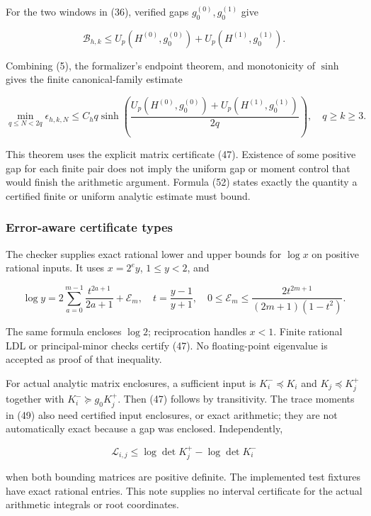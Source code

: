 For the two windows in (36), verified gaps \(g_0^{(0)},g_0^{(1)}\) give

\[
 \boxed{\mathcal B_{h,k}\le
 U_p(H^{(0)},g_0^{(0)})+U_p(H^{(1)},g_0^{(1)}).}                   \tag{51}
\]

Combining (5), the formalizer's endpoint theorem, and monotonicity of \(\sinh\) gives the finite canonical-family estimate

\[
 \boxed{
 \min_{q\le N<2q}\epsilon_{h,k,N}
 \le C_hq\sinh\!\left(
 \frac{U_p(H^{(0)},g_0^{(0)})+U_p(H^{(1)},g_0^{(1)})}{2q}
 \right),\quad q\ge k\ge3.}                                     \tag{52}
\]

This theorem uses the explicit matrix certificate (47). Existence of some positive gap for each finite pair does not imply the uniform gap or moment control that would finish the arithmetic argument. Formula (52) states exactly the quantity a certified finite or uniform analytic estimate must bound.

\subsubsection{Error-aware certificate types}\label{endpoint-restriction_original--error-aware-certificate-types}

The checker supplies exact rational lower and upper bounds for \(\log x\) on positive rational inputs. It uses \(x=2^e y\), \(1\le y<2\), and

\[
 \log y=2\sum_{a=0}^{m-1}\frac{t^{2a+1}}{2a+1}+\mathcal E_m,
 \quad t=\frac{y-1}{y+1},\quad
 0\le\mathcal E_m\le
 \frac{2t^{2m+1}}{(2m+1)(1-t^2)}.                                 \tag{53}
\]

The same formula encloses \(\log2\); reciprocation handles \(x<1\). Finite rational LDL or principal-minor checks certify (47). No floating-point eigenvalue is accepted as proof of that inequality.

For actual analytic matrix enclosures, a sufficient input is \(K_i^-\preceq K_i\) and \(K_j\preceq K_j^+\) together with \(K_i^-\succeq g_0K_j^+\). Then (47) follows by transitivity. The trace moments in (49) also need certified input enclosures, or exact arithmetic; they are not automatically exact because a gap was enclosed. Independently,

\[
 \mathcal L_{i,j}\le\log\det K_j^+-\log\det K_i^-
                                                                    \tag{54}
\]

when both bounding matrices are positive definite. The implemented test fixtures have exact rational entries. This note supplies no interval certificate for the actual arithmetic integrals or root coordinates.

